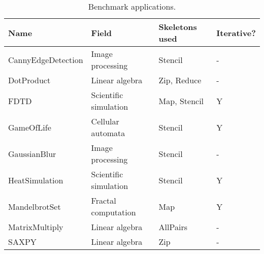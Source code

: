 \newpage
\begin{table}[h]
\centering
\begin{tabular}{| l | l | l | l |}
\hline
\textbf{Name} & \textbf{Field} & \textbf{Skeletons used} & \textbf{Iterative?}\\
\hline
CannyEdgeDetection & Image processing & Stencil & -\\
DotProduct & Linear algebra & Zip, Reduce & -\\
FDTD & Scientific simulation & Map, Stencil & Y\\
GameOfLife & Cellular automata & Stencil & Y\\
GaussianBlur & Image processing & Stencil & -\\
HeatSimulation & Scientific simulation & Stencil & Y\\
MandelbrotSet & Fractal computation & Map & Y\\
MatrixMultiply & Linear algebra & AllPairs & -\\
SAXPY & Linear algebra & Zip & -\\
\hline
\end{tabular}
\caption{Benchmark applications.}
\end{table}

\newpage
